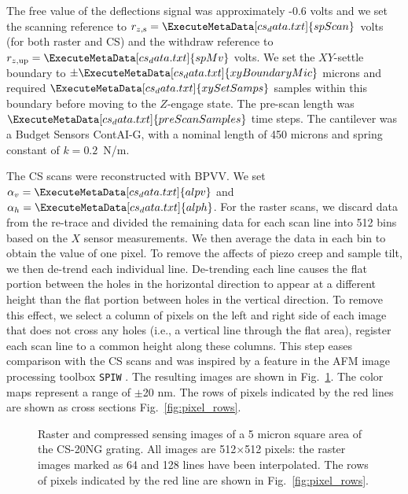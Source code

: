 \documentclass[twocolumn,oneside]{IEEEtran/IEEEtran}
\newcommand{\xc}{\ensuremath{X}\xspace}
\newcommand{\rzup}{\ensuremath{r_{z,\textrm{up}}}\xspace}
\newcommand{\rzs}{\ensuremath{r_{z,\textrm{s}}}\xspace}
\newcommand{\scanD}[1]{\ExecuteMetaData[cs_data.txt]{#1}}
\begin{document}
The free value of the deflections signal was approximately -0.6 volts
and we set the scanning reference to ${\rzs=\scanD{spScan}}$~volts (for both raster and CS)
and the withdraw reference to ${\rzup=\scanD{spMv}}$ volts. We set the
$XY$-settle boundary to $\pm \scanD{xyBoundaryMic}$ microns and
required $\scanD{xySetSamps}$ samples within this boundary before
moving to the $Z$-engage state. The pre-scan length was
$\scanD{preScanSamples}$ time steps. The cantilever was a Budget
Sensors ContAI-G, with a nominal length of 450 microns and spring
constant of $k=0.2$~N/m.

The CS scans were reconstructed with BPVV. We set
${\alpha_v=\scanD{alpv}}$ and ${\alpha_h=\scanD{alph}}$. 
For the raster scans, we discard data from the re-trace and divided
the remaining data for each scan line into 512 bins based on the \xc
sensor measurements. We then average the data in each bin to obtain
the value of one pixel. To remove the affects of piezo creep and
sample tilt, we then de-trend each individual line. De-trending each
line causes the flat portion between the holes in the horizontal
direction to appear at a different height than the flat portion
between holes in the vertical direction. To remove this effect, we
select a column of pixels on the left and right side of each image
that does not cross any holes (i.e., a vertical line through the flat
area), register each scan line to a common height along these columns.
This step eases comparison with the CS scans and was inspired by a
feature in the AFM image processing toolbox \texttt{SPIW} \cite{spiw}.
The resulting images are shown in Fig.~\ref{fig:resultsF1_images}.
The color maps represent a range of $\pm$20 nm. The
rows of pixels indicated by the red lines are shown as cross sections
Fig.~\ref{fig:pixel_rows}.

\begin{figure}
  \centering
  
  \caption{Raster and compressed sensing images of a 5 micron square
    area of the CS-20NG grating. All images are 512$\times$512 pixels:
    the raster images marked as 64 and 128 lines have been
    interpolated. The rows of pixels indicated by the red line are
    shown in Fig.~\ref{fig:pixel_rows}.}
  \label{fig:resultsF1_images}
\end{figure}

%     
\end{document}
